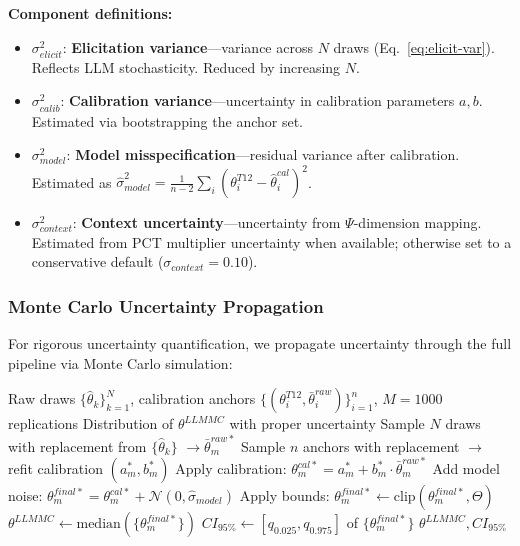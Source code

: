 \textbf{Component definitions:}
\begin{itemize}
    \item $\sigma^2_{elicit}$: \textbf{Elicitation variance}---variance across $N$ draws
    (Eq.~\ref{eq:elicit-var}). Reflects LLM stochasticity. Reduced by increasing $N$.
    \item $\sigma^2_{calib}$: \textbf{Calibration variance}---uncertainty in calibration
    parameters $a, b$. Estimated via bootstrapping the anchor set.
    \item $\sigma^2_{model}$: \textbf{Model misspecification}---residual variance after
    calibration. Estimated as
    $\hat{\sigma}^2_{model} = \frac{1}{n-2}\sum_i (\theta^{T12}_i - \hat{\theta}^{cal}_i)^2$.
    \item $\sigma^2_{context}$: \textbf{Context uncertainty}---uncertainty from $\Psi$-dimension
    mapping. Estimated from PCT multiplier uncertainty when available; otherwise set to a
    conservative default ($\sigma_{context} = 0.10$).
\end{itemize}

\subsubsection{Monte Carlo Uncertainty Propagation}
\label{sec:AN-mc-propagation}

For rigorous uncertainty quantification, we propagate uncertainty through the full
pipeline via Monte Carlo simulation:

\begin{algorithm}[H]
\caption{LLMMC Uncertainty Propagation (MC-UP)}
\label{alg:mc-up}
\begin{algorithmic}[1]
\REQUIRE Raw draws $\{\hat{\theta}_k\}_{k=1}^N$, calibration anchors
$\{(\theta^{T12}_i, \bar{\theta}^{raw}_i)\}_{i=1}^n$, $M = 1000$ replications
\ENSURE Distribution of $\theta^{LLMMC}$ with proper uncertainty
    \STATE Sample $N$ draws with replacement from $\{\hat{\theta}_k\}$
           $\to \bar{\theta}^{raw*}_m$
    \STATE Sample $n$ anchors with replacement $\to$ refit calibration $(a^*_m, b^*_m)$
    \STATE Apply calibration: $\theta^{cal*}_m = a^*_m + b^*_m \cdot \bar{\theta}^{raw*}_m$
    \STATE Add model noise: $\theta^{final*}_m = \theta^{cal*}_m + \mathcal{N}(0, \hat{\sigma}_{model})$
    \STATE Apply bounds: $\theta^{final*}_m \leftarrow \text{clip}(\theta^{final*}_m, \Theta)$
\ENDFOR
\STATE $\theta^{LLMMC} \leftarrow \text{median}(\{\theta^{final*}_m\})$
\STATE $CI_{95\%} \leftarrow [q_{0.025}, q_{0.975}]$ of $\{\theta^{final*}_m\}$
\RETURN $\theta^{LLMMC}, CI_{95\%}$
\end{algorithmic}
\end{algorithm}

